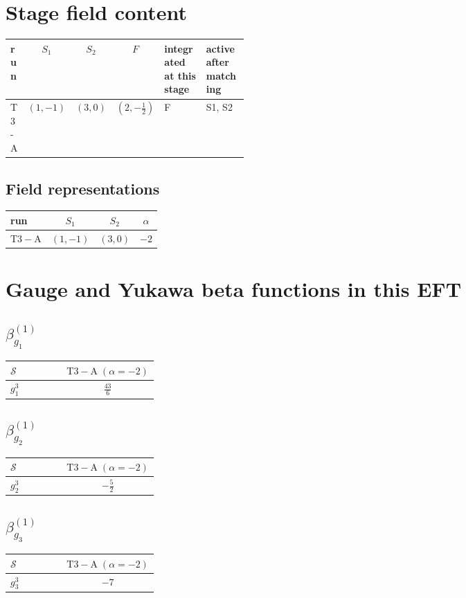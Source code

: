 \documentclass[9pt]{article}
\begin{document}
\section*{Stage field content}
\begin{longtable}{@{}lccc p{0.20\linewidth}p{0.20\linewidth}@{}}
\toprule
run & $S_1$ & $S_2$ & $F$ & integrated at this stage & active after matching \\
\midrule
T3-A & $(1,-1)$ & $(3,0)$ & $(2,- \frac{1}{2})$ & F & S1, S2 \\
\bottomrule
\end{longtable}
\subsection*{Field representations}
\begin{longtable}{@{}lccc@{}}
\toprule
run & $S_1$ & $S_2$ & $\alpha$ \\
\midrule
$\mathrm{T3-A}$ & $(1,-1)$ & $(3,0)$ & $-2$ \\
\bottomrule
\end{longtable}
\section*{Gauge and Yukawa beta functions in this EFT}
\subsection*{$ \beta_{g_1}^{(1)} $}
\begin{longtable}{@{}p{0.38\linewidth}c@{}}
\toprule
$\mathcal{S}$ & $ \mathrm{T3-A}\;(\alpha=-2) $ \\
\midrule
$ g_1^3 $ & $ \frac{43}{6} $ \\
\bottomrule
\end{longtable}
\subsection*{$ \beta_{g_2}^{(1)} $}
\begin{longtable}{@{}p{0.38\linewidth}c@{}}
\toprule
$\mathcal{S}$ & $ \mathrm{T3-A}\;(\alpha=-2) $ \\
\midrule
$ g_2^3 $ & $ - \frac{5}{2} $ \\
\bottomrule
\end{longtable}
\subsection*{$ \beta_{g_3}^{(1)} $}
\begin{longtable}{@{}p{0.38\linewidth}c@{}}
\toprule
$\mathcal{S}$ & $ \mathrm{T3-A}\;(\alpha=-2) $ \\
\midrule
$ g_3^3 $ & $ -7 $ \\
\bottomrule
\end{longtable}
\end{document}
